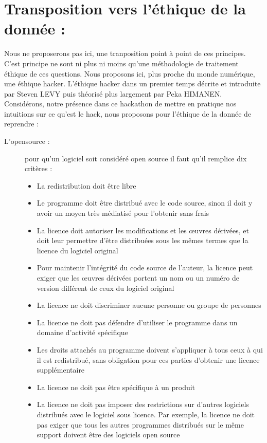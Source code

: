 \documentclass[a4paper,12pt]{article}
\begin{document}
\section{Transposition vers l'éthique de la donnée : }
Nous ne proposerons pas ici, une tranposition point à point de ces principes. C'est principe ne sont ni plus ni moins qu'une méthodologie de traitement éthique de ces questions. 
Nous proposons ici, plus proche du monde numérique, une éthique hacker. L'éthique hacker dans un premier temps décrite et introduite par Steven LEVY puis théorisé plus largement par Peka HIMANEN. Considérons, notre présence dans ce hackathon de mettre en pratique nos intuitions sur ce qu'est le hack, nous proposons pour l'éthique de la donnée de reprendre :
	\begin{description}
		\item [L'opensource : ] pour qu'un logiciel soit considéré open source il faut qu'il remplice dix critères :
		\begin{itemize}
			\item  La redistribution doit être libre
			\item Le programme doit être distribué avec le code source, sinon il doit y avoir un moyen très médiatisé pour l’obtenir sans frais
			\item La licence doit autoriser les modifications et les œuvres dérivées, et doit leur permettre d'être distribuées sous les mêmes termes que la licence du logiciel original
			\item Pour maintenir l’intégrité du code source de l'auteur, la licence peut exiger que les œuvres dérivées portent un nom ou un numéro de version différent de ceux du logiciel original
			\item La licence ne doit discriminer aucune personne ou groupe de personnes
			\item La licence ne doit pas défendre d'utiliser le programme dans un domaine d'activité spécifique
			\item Les droits attachés au programme doivent s'appliquer à tous ceux à qui il est redistribué, sans obligation pour ces parties d'obtenir une licence supplémentaire
			\item La licence ne doit pas être spécifique à un produit
			\item La licence ne doit pas imposer des restrictions sur d'autres logiciels distribués avec le logiciel sous licence. Par exemple, la licence ne doit pas exiger que tous les autres programmes distribués sur le même support doivent être des logiciels open source 

\end{itemize}
\end{description}
\end{document}

